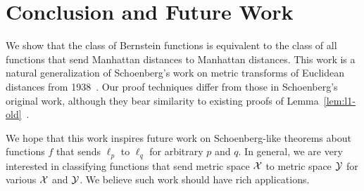 
\section{Conclusion and Future Work}
We show that the class of Bernstein functions is equivalent to the class
of all functions that send Manhattan distances to Manhattan distances.
This work is a natural generalization of Schoenberg's work on metric
transforms of Euclidean distances from 1938~\cite{s38,
  s42, ns41}.
Our proof techniques differ from those in Schoenberg's
original work, although they bear similarity to existing proofs of
Lemma~\ref{lem:l1-old}~\cite{dl09}.

We hope that this work inspires future work on Schoenberg-like theorems
about functions $f$ that sends $\ell_p$ to $\ell_q$ for arbitrary $p$
and $q$.
In general, we are very
interested in classifying functions that send metric space ${\cal X}$ to
metric space ${\cal Y}$ for various ${\cal X}$ and ${\cal Y}$. We
believe such work should have rich applications.

